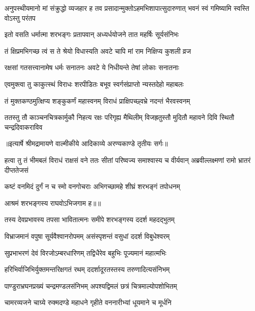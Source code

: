 \threelineshloka
{अनुपस्थीयमानो मां संक्रुद्धो व्यजहार ह}
{तव प्रसादान्मुक्तोऽहमभिशापात्सुदारुणात्}
{भवनं स्वं गमिष्यामि स्वस्ति वोऽस्तु परंतप} %

\twolineshloka
{इतो वसति धर्मात्मा शरभङ्गः प्रतापवान्}
{अध्यर्धयोजने तात महर्षिः सूर्यसंनिभः} %

\twolineshloka
{तं क्षिप्रमभिगच्छ त्वं स ते श्रेयो विधास्यति}
{अवटे चापि मां राम निक्षिप्य कुशली व्रज} %

\twolineshloka
{रक्षसां गतसत्त्वानामेष धर्मः सनातनः}
{अवटे ये निधीयन्ते तेषां लोकाः सनातनाः} %

\twolineshloka
{एवमुक्त्वा तु काकुत्स्थं विराधः शरपीडितः}
{बभूव स्वर्गसंप्राप्तो न्यस्तदेहो महाबलः} %

\twolineshloka
{तं मुक्तकण्ठमुत्क्षिप्य शङ्कुकर्णं महास्वनम्}
{विराधं प्राक्षिपच्छ्वभ्रे नदन्तं भैरवस्वनम्} %

\fourlineindentedshloka
{ततस्तु तौ काञ्चनचित्रकार्मुकौ}
{ निहत्य रक्षः परिगृह्य मैथिलीम्}
{विजह्रतुस्तौ मुदितौ महावने}
{ दिवि स्थितौ चन्द्रदिवाकराविव} %


{॥इत्यार्षे श्रीमद्रामायणे वाल्मीकीये आदिकाव्ये अरण्यकाण्डे तृतीयः सर्गः॥}


\threelineshloka
{हत्वा तु तं भीमबलं विराधं राक्षसं वने}
{ततः सीतां परिष्वज्य समाश्वास्य च वीर्यवान्}
{अब्रवील्लक्ष्मणां रामो भ्रातरं दीप्ततेजसं} %

\twolineshloka
{कष्टं वनमिदं दुर्गं न च स्मो वनगोचराः}
{अभिगच्छामहे शीघ्रं शरभङ्गं तपोधनम्} %

{आश्रमं शरभङ्गस्य राघवोऽभिजगाम ह॥॥} %

\addtocounter{shlokacount}{1}

\twolineshloka
{तस्य देवप्रभावस्य तपसा भावितात्मनः}
{समीपे शरभङ्गस्य ददर्श महदद्भुतम्} %

\twolineshloka
{विभ्राजमानं वपुषा सूर्यवैश्वानरोपमम्}
{असंस्पृशन्तं वसुधां ददर्श विबुधेश्वरम्} %

\twolineshloka
{सुप्रभाभरणं देवं विरजोऽम्बरधारिणम्}
{तद्विधैरेव बहुभिः पूज्यमानं महात्मभिः} %

\twolineshloka
{हरिभिर्वाजिभिर्युक्तमन्तरिक्षगतं रथम्}
{ददर्शादूरतस्तस्य तरुणादित्यसंनिभम्} %

\twolineshloka
{पाण्डुराभ्रघनप्रख्यं चन्द्रमण्डलसंनिभम्}
{अपश्यद्विमलं छत्रं चित्रमाल्योपशोभितम्} %

\twolineshloka
{चामरव्यजने चाग्र्ये रुक्मदण्डे महाधने}
{गृहीते वननारीभ्यां धूयमाने च मूर्धनि} %


